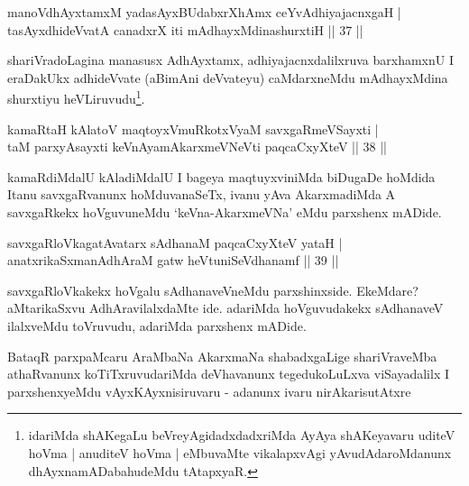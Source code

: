 
\begin{shl}
manoV\s dhAyxtamxM yadasAyxBUdabxrXhAmx ceYvAdhiyajacnxgaH |\\
tasAyxdhideVvatA canadxrX iti mAdhayxMdinashurxtiH \hfill || 37 ||
\end{shl}

\begin{artha}
shariVradoLagina manasusx AdhAyxtamx, adhiyajacnxdalilxruva barxhamxnU I eraDakUkx adhideVvate (aBimAni deVvateyu) caMdarxneMdu mAdhayxMdina shurxtiyu heVLiruvudu\footnote{idariMda shAKegaLu beVreyAgidadxdadxriMda AyAya shAKeyavaru uditeV hoVma | anuditeV hoVma | eMbuvaMte vikalapxvAgi yAvudAdaroMdanunx dhAyxnamADabahudeMdu tAtapxyaR.}.
\end{artha}

\begin{shl}
kamaRtaH kAlatoV maqtoyxVmuRkotxV\s yaM savxgaRmeVSayxti |\\
taM parxyAsayxti keVnAyamAkarxmeVNeVti paqcaCxyXteV \hfill || 38 ||
\end{shl}

\begin{artha}
kamaRdiMdalU kAladiMdalU I bageya maqtuyxviniMda biDugaDe hoMdida Itanu savxgaRvanunx hoMduvanaSeTx, ivanu yAva AkarxmadiMda A savxgaRkekx hoVguvuneMdu `keVna-AkarxmeVNa' eMdu parxshenx mADide.
\end{artha}


\begin{shl}
savxgaRloVkagatAvatarx sAdhanaM paqcaCxyXteV yataH |\\
anatxrikaSxmanAdhAraM gatw heVtuniSeVdhanamf \hfill || 39 ||
\end{shl}

\begin{artha}
savxgaRloVkakekx hoVgalu sAdhanaveVneMdu parxshinxside. EkeMdare? aMtarikaSxvu AdhAravilalxdaMte ide. adariMda hoVguvudakekx sAdhanaveV ilalxveMdu toVruvudu, adariMda parxshenx mADide.
\end{artha}

\begin{artha}
BataqR parxpaMcaru AraMbaNa AkarxmaNa shabadxgaLige shariVraveMba athaRvanunx koTiTxruvudariMda deVhavanunx tegedukoLuLxva viSayadalilx I parxshenxyeMdu vAyxKAyxnisiruvaru - adanunx ivaru nirAkarisutAtxre \mdash 
\end{artha}

